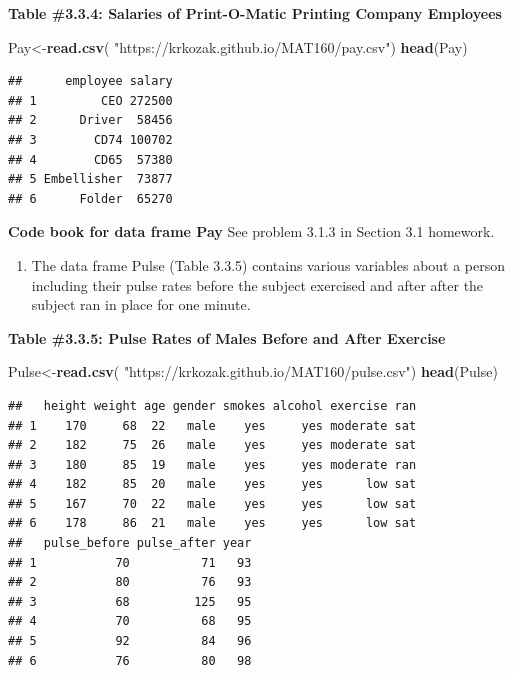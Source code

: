 \documentclass[
]{book}
\newenvironment{Shaded}{\begin{snugshade}}{\end{snugshade}}
\newcommand{\KeywordTok}[1]{\textcolor[rgb]{0.13,0.29,0.53}{\textbf{#1}}}
\newcommand{\NormalTok}[1]{#1}
\newcommand{\StringTok}[1]{\textcolor[rgb]{0.31,0.60,0.02}{#1}}
\providecommand{\tightlist}{%
  \setlength{\itemsep}{0pt}\setlength{\parskip}{0pt}}
\begin{document}
\textbf{Table \#3.3.4: Salaries of Print-O-Matic Printing Company Employees}

\begin{Shaded}
\begin{Highlighting}[]
\NormalTok{Pay<-}\KeywordTok{read.csv}\NormalTok{(}
  \StringTok{"https://krkozak.github.io/MAT160/pay.csv"}\NormalTok{)}
\KeywordTok{head}\NormalTok{(Pay)}
\end{Highlighting}
\end{Shaded}

\begin{verbatim}
##      employee salary
## 1         CEO 272500
## 2      Driver  58456
## 3        CD74 100702
## 4        CD65  57380
## 5 Embellisher  73877
## 6      Folder  65270
\end{verbatim}

\textbf{Code book for data frame Pay} See problem 3.1.3 in Section 3.1 homework.

\begin{enumerate}
\def\labelenumi{\arabic{enumi}.}
\setcounter{enumi}{7}
\tightlist
\item
  The data frame Pulse (Table 3.3.5) contains various variables about a person including their pulse rates before the subject exercised and after after the subject ran in place for one minute.
\end{enumerate}

\textbf{Table \#3.3.5: Pulse Rates of Males Before and After Exercise}

\begin{Shaded}
\begin{Highlighting}[]
\NormalTok{Pulse<-}\KeywordTok{read.csv}\NormalTok{(}
  \StringTok{"https://krkozak.github.io/MAT160/pulse.csv"}\NormalTok{)}
\KeywordTok{head}\NormalTok{(Pulse)}
\end{Highlighting}
\end{Shaded}

\begin{verbatim}
##   height weight age gender smokes alcohol exercise ran
## 1    170     68  22   male    yes     yes moderate sat
## 2    182     75  26   male    yes     yes moderate sat
## 3    180     85  19   male    yes     yes moderate ran
## 4    182     85  20   male    yes     yes      low sat
## 5    167     70  22   male    yes     yes      low sat
## 6    178     86  21   male    yes     yes      low sat
##   pulse_before pulse_after year
## 1           70          71   93
## 2           80          76   93
## 3           68         125   95
## 4           70          68   95
## 5           92          84   96
## 6           76          80   98
\end{verbatim}
\end{document}
